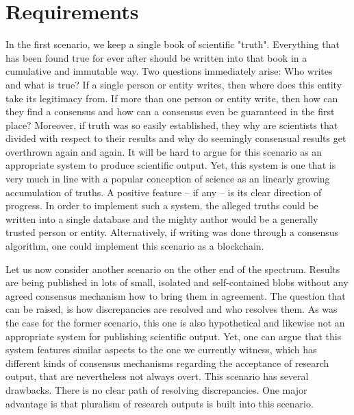 \documentclass[14pt]{article}
\begin{document}


\section{Requirements}


In the first scenario, we keep a single book of scientific "truth". Everything that has been found true for ever after should be written into that book in a cumulative and immutable way. Two questions immediately arise: Who writes and what is true? If a single person or entity writes, then where does this entity take its legitimacy from. If more than one person or entity write, then how can they find a consensus and how can a consensus even be guaranteed in the first place? Moreover, if truth was so easily established, they why are scientists that divided with respect to their results and why do seemingly consensual results get overthrown again and again. It will be hard to argue for this scenario as an appropriate system to produce scientific output. Yet, this system is one that is very much in line with a popular conception of science as an linearly growing accumulation of truths. A positive feature -- if any -- is its clear direction of progress. In order to implement such a system, the alleged truths could be written into a single database and the mighty author would be a generally trusted person or entity. Alternatively, if writing was done through a consensus algorithm, one could implement this scenario as a blockchain.

Let us now consider another scenario on the other end of the spectrum. Results are being published in lots of small, isolated and self-contained blobs without any agreed consensus mechanism  how to bring them in agreement. The question that can be raised, is how discrepancies are resolved and who resolves them. As was the case for the former scenario, this one is also hypothetical and likewise not an appropriate system for publishing scientific output. Yet, one can argue that this system features similar aspects to the one we currently witness, which has different kinds of consensus mechanisms regarding the acceptance of research output, that are nevertheless not always overt. 
This scenario has several drawbacks. There is no clear path of resolving discrepancies. One major advantage is that pluralism of research outputs is built into this scenario.  
\end{document}
